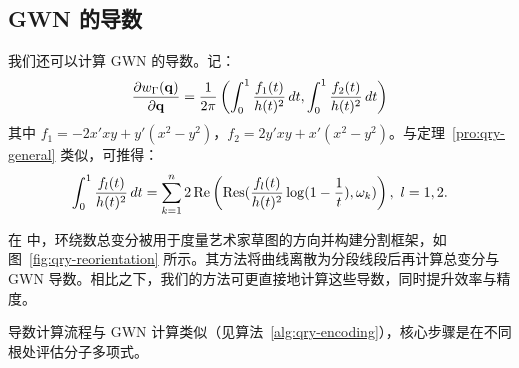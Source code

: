 \subsection{GWN 的导数}\label{sec:qry-derivative}
我们还可以计算 GWN 的导数。记：
\begin{equation}
    \frac{\partial w_{\Gamma}(\mathbf{q})}{\partial \mathbf{q}}=\frac{1}{2 \pi} \left(\int_0^1\frac{f_1(t)}{h(t)^2}\,dt,\int_0^1\frac{f_2(t)}{h(t)^2}\,dt\right)
\end{equation}
其中 $f_1 =-2 x' x y +y' (x ^2-y ^2)$，$f_2 =2y' x y +x' (x ^2-y ^2)$。与定理~\ref{pro:qry-general} 类似，可推得：
\begin{equation}
    \int_0^1\frac{f_l(t)}{h(t)^2}\,dt=\sum_{k=1}^n2\mathop{\mathrm{Re}}\left(\mathop{\mathrm{Res}}(\frac{f_l(t)}{h(t)^2}\log(1-\frac{1}{t}),\omega_k)\right),\  l=1,2.
\end{equation}

在 \cite{Scrivener2024WindingNF} 中，环绕数总变分被用于度量艺术家草图的方向并构建分割框架，如图~\ref{fig:qry-reorientation} 所示。其方法将曲线离散为分段线段后再计算总变分与 GWN 导数。相比之下，我们的方法可更直接地计算这些导数，同时提升效率与精度。

导数计算流程与 GWN 计算类似（见算法~\ref{alg:qry-encoding}），核心步骤是在不同根处评估分子多项式。


\begin{algorithm}[t]
  \caption{WindingNumber\Bezier：计算任意 \Bezier 曲线的广义环绕数}\label{alg:qry-encoding}
  

\end{algorithm}

\begin{algorithm}[t]
  \caption{CalculateRoots：计算复系数多项式的根}\label{alg:qry-encoding2}
  
\end{algorithm}

